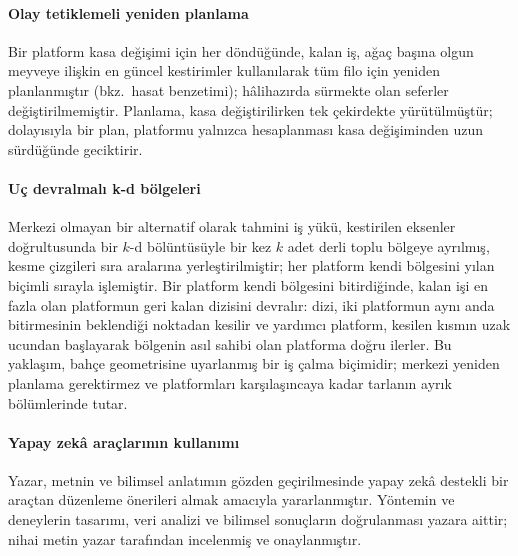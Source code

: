 \paragraph{Olay tetiklemeli yeniden planlama} Bir platform kasa değişimi için her döndüğünde,
kalan iş, ağaç başına olgun meyveye ilişkin en güncel kestirimler kullanılarak tüm filo için
yeniden planlanmıştır (bkz.\ hasat benzetimi); hâlihazırda sürmekte olan
seferler değiştirilmemiştir. Planlama, kasa değiştirilirken tek çekirdekte yürütülmüştür; dolayısıyla
bir plan, platformu yalnızca hesaplanması kasa değişiminden uzun sürdüğünde geciktirir.

\paragraph{Uç devralmalı k-d bölgeleri} Merkezi olmayan bir alternatif olarak tahmini
iş yükü, kestirilen eksenler doğrultusunda bir $k$-d bölüntüsüyle bir kez $k$ adet derli toplu bölgeye ayrılmış,
kesme çizgileri sıra aralarına yerleştirilmiştir; her platform
kendi bölgesini yılan biçimli sırayla işlemiştir. Bir platform kendi bölgesini bitirdiğinde,
kalan işi en fazla olan platformun geri kalan dizisini devralır: dizi, iki platformun
aynı anda bitirmesinin beklendiği noktadan kesilir ve yardımcı platform,
kesilen kısmın uzak ucundan başlayarak bölgenin asıl sahibi olan platforma doğru ilerler. Bu yaklaşım, bahçe geometrisine uyarlanmış
bir iş çalma \citep{blumofe1999} biçimidir; merkezi yeniden planlama gerektirmez ve platformları
karşılaşıncaya kadar tarlanın ayrık bölümlerinde tutar.

\paragraph{Yapay zekâ araçlarının kullanımı} Yazar, metnin ve bilimsel anlatımın
gözden geçirilmesinde yapay zekâ destekli bir araçtan düzenleme önerileri almak
amacıyla yararlanmıştır. Yöntemin ve deneylerin tasarımı, veri analizi ve bilimsel
sonuçların doğrulanması yazara aittir; nihai metin yazar tarafından incelenmiş ve
onaylanmıştır.
